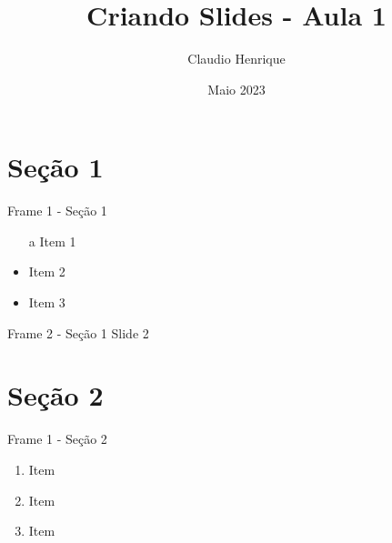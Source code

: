\documentclass{beamer}
\title{Criando Slides - Aula 1}
\author{Claudio Henrique}
\date{Maio 2023}
\begin{document}
\maketitle

\section{Seção 1}
	\begin{frame}{Frame 1 - Seção 1}
		\begin{itemize}
			\item[a] Item 1
			\item Item 2
			\item Item 3
		\end{itemize}
	\end{frame}
	
	\begin{frame}{Frame 2 - Seção 1}
		Slide 2
	\end{frame}

\section{Seção 2}

	\begin{frame}{Frame 1 - Seção 2}
		\begin{enumerate} [<+- | alert@+>] %
			\item Item
			\item Item
			\item Item
		\end{enumerate}
	\end{frame}
\end{document}

